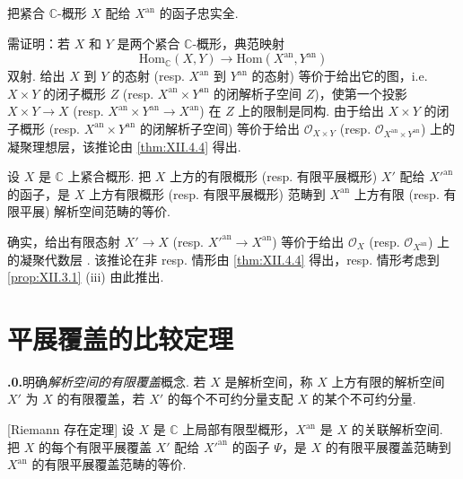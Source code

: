 \begin{corollary}\label{cor:XII.4.5}
把紧合 $\mathbb{C}$-概形 $X$ 配给 $X^{\mathrm{an}}$ 的函子忠实全.
\end{corollary}

需证明：若 $X$ 和 $Y$ 是两个紧合 $\mathbb{C}$-概形，典范映射
\[
\mathrm{Hom}_{\mathbb{C}}(X, Y) \longrightarrow \mathrm{Hom}(X^{\mathrm{an}}, Y^{\mathrm{an}})
\]
双射. 给出 $X$ 到 $Y$ 的态射 (resp. $X^{\mathrm{an}}$ 到 $Y^{\mathrm{an}}$ 的态射) 等价于给出它的图，i.e. $X \times Y$ 的闭子概形 $Z$ (resp. $X^{\mathrm{an}} \times Y^{\mathrm{an}}$ 的闭解析子空间 $Z$)，使第一个投影 $X \times Y \to X$ (resp. $X^{\mathrm{an}} \times Y^{\mathrm{an}} \to X^{\mathrm{an}}$) 在 $Z$ 上的限制是同构. 由于给出 $X \times Y$ 的闭子概形 (resp. $X^{\mathrm{an}} \times Y^{\mathrm{an}}$ 的闭解析子空间) 等价于给出 $\mathcal{O}_{X \times Y}$ (resp. $\mathcal{O}_{X^{\mathrm{an}} \times Y^{\mathrm{an}}}$) 上的凝聚理想层，该推论由 \ref{thm:XII.4.4} 得出.

\begin{corollary}\label{cor:XII.4.6}
设 $X$ 是 $\mathbb{C}$ 上紧合概形. 把 $X$ 上方的有限概形 (resp. 有限平展概形) $X'$ 配给 $X'^{\mathrm{an}}$ 的函子，是 $X$ 上方有限概形 (resp. 有限平展概形) 范畴到 $X^{\mathrm{an}}$ 上方有限 (resp. 有限平展) 解析空间范畴的等价.
\end{corollary}

确实，给出有限态射 $X' \to X$ (resp. $X'^{\mathrm{an}} \to X^{\mathrm{an}}$) 等价于给出 $\mathcal{O}_X$ (resp. $\mathcal{O}_{X^{\mathrm{an}}}$) 上的凝聚代数层 \cite[第 19 号 §5 定理 2]{exp12-4}. 该推论在非 resp. 情形由 \ref{thm:XII.4.4} 得出，resp. 情形考虑到 \ref{prop:XII.3.1} (iii) 由此推出.

\section{平展覆盖的比较定理}

\addtocounter{theorem}{-1}\noindent\textbf{\thesection.0.}\quad 明确\emph{解析空间的有限覆盖}概念. 若 $X$ 是解析空间，称 $X$ 上方有限的解析空间 $X'$ 为 $X$ 的有限覆盖，若 $X'$ 的每个不可约分量支配 $X$ 的某个不可约分量.

\begin{theorem}\label{thm:XII.5.1}
[Riemann 存在定理] 设 $X$ 是 $\mathbb{C}$ 上局部有限型概形，$X^{\mathrm{an}}$ 是 $X$ 的关联解析空间. 把 $X$ 的每个有限平展覆盖 $X'$ 配给 $X'^{\mathrm{an}}$ 的函子 $\Psi$，是 $X$ 的有限平展覆盖范畴到 $X^{\mathrm{an}}$ 的有限平展覆盖范畴的等价.
\end{theorem}

